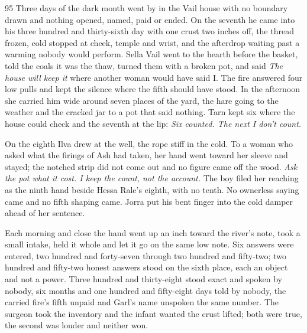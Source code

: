 
\scenebreak


\scenebreak


\scenebreak

\CRtailpiece
\begin{CRchronicle}{95}
Three days of the dark month went by in the Vail house with no boundary drawn and nothing opened, named, paid or ended. On the seventh he came into his three hundred and thirty-sixth day with one crust two inches off, the thread frozen, cold stopped at cheek, temple and wrist, and the afterdrop waiting past a warming nobody would perform. Sella Vail went to the hearth before the basket, told the coals it was the thaw, turned them with a broken pot, and said \emph{The house will keep it} where another woman would have said I. The fire answered four low pulls and kept the silence where the fifth should have stood. In the afternoon she carried him wide around seven places of the yard, the hare going to the weather and the cracked jar to a pot that said nothing. Tarn kept six where the house could check and the seventh at the lip: \emph{Six counted. The next I don’t count.}

On the eighth Ilva drew at the well, the rope stiff in the cold. To a woman who asked what the firings of Ash had taken, her hand went toward her sleeve and stayed; the notched strip did not come out and no figure came off the wood. \emph{Ask the pot what it cost. I keep the count, not the account.} The boy filed her reaching as the ninth hand beside Hessa Rale’s eighth, with no tenth. No ownerless saying came and no fifth shaping came. Jorra put his bent finger into the cold damper ahead of her sentence.

Each morning and close the hand went up an inch toward the river’s note, took a small intake, held it whole and let it go on the same low note. Six answers were entered, two hundred and forty-seven through two hundred and fifty-two; two hundred and fifty-two honest answers stood on the sixth place, each an object and not a power. Three hundred and thirty-eight stood exact and spoken by nobody, six months and one hundred and fifty-eight days told by nobody, the carried fire’s fifth unpaid and Garl’s name unspoken the same number. The surgeon took the inventory and the infant wanted the crust lifted; both were true, the second was louder and neither won.


\end{CRchronicle}
